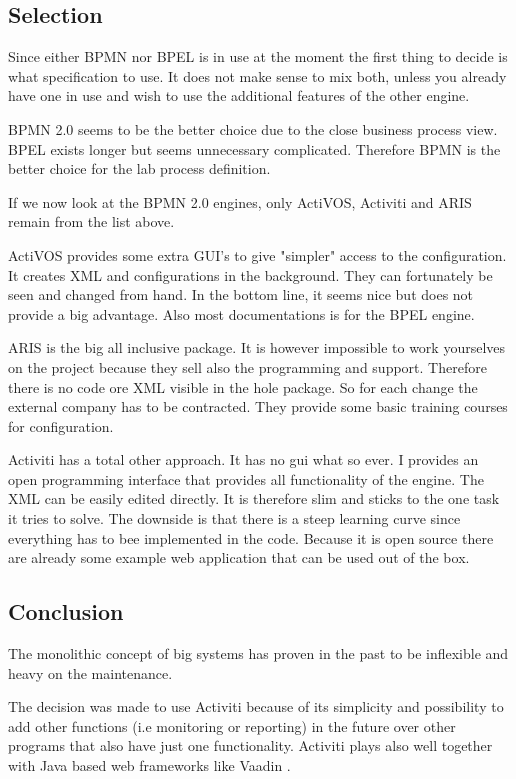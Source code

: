 \documentclass[paper=a4,twoside=false,BCOR=0mm,DIV=calc,fontsize=12pt]{scrartcl}
\begin{document}
\subsection{Selection}
Since either BPMN nor BPEL is in use at the moment the first thing to decide is what specification to use.
It does not make sense to mix both, unless you already have one in use and wish to use the additional features of the other engine. 

BPMN 2.0 seems to be the better choice due to the close business process view. BPEL exists longer but seems unnecessary complicated.
Therefore BPMN is the better choice for the lab process definition. 

If we now look at the BPMN 2.0 engines, only ActiVOS, Activiti and ARIS remain from the list above.

ActiVOS provides some extra GUI's to give "simpler" access to the configuration. It creates XML and configurations in the background.
They can fortunately be seen and changed from hand. In the bottom line, it seems nice but does not provide a big advantage. Also most documentations is for the BPEL engine.

ARIS is the big all inclusive package. It is however impossible to work yourselves on the project because they sell also the programming and support. Therefore there is no code ore XML visible in the hole package. So for each change the external company has to be contracted.
They provide some basic training courses for configuration.

Activiti has a total other approach. It has no gui what so ever. I provides an open programming interface that provides all functionality 
of the engine. The XML can be easily edited directly. It is therefore slim and sticks to the one task it tries to solve.
The downside is that there is a steep learning curve since everything has to bee implemented in the code. 
Because it is open source there are already some example web application that can be used out of the box. 

\subsection{Conclusion}
The monolithic concept of big systems has proven in the past to be inflexible and heavy on the maintenance. 

The decision was made to use Activiti because of its simplicity and possibility to add other functions (i.e monitoring or reporting) in the future over other programs that also have just one functionality.
Activiti plays also well together with Java based web frameworks like Vaadin \cite{Vaadin}.
\end{document}
